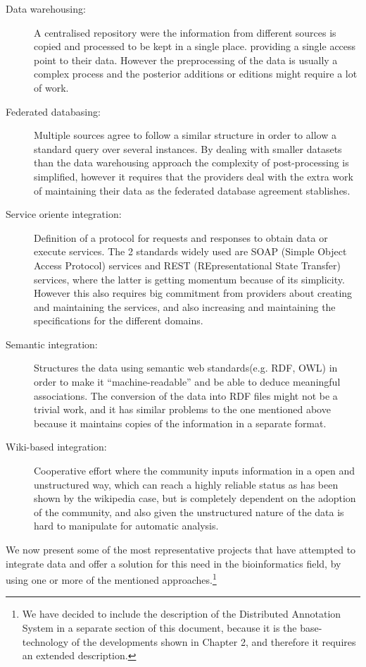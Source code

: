 \begin{description}
\item[Data warehousing:] 			A centralised repository were the information from different sources is copied and processed to be kept  in a single place. providing a single access point to their data. However the preprocessing of the data is usually a complex process and the posterior additions or editions might require a lot of work.
\item[Federated databasing:] 		Multiple sources agree to follow a similar structure in order to allow a standard query over several instances. By dealing with smaller datasets than the data warehousing approach the complexity of post-processing is simplified, however it requires that the providers deal with the extra work of maintaining their data as the federated database agreement stablishes.
\item[Service oriente integration:] 	Definition of a protocol for requests and responses to obtain data or execute services. The 2 standards widely used are SOAP (Simple Object Access Protocol) services and REST (REpresentational State Transfer) services, where the latter is getting momentum because of its simplicity. However this also requires big commitment from providers about creating and maintaining the services, and also increasing and maintaining the specifications for the different domains.
\item[Semantic integration:] 		Structures the data using semantic web standards(e.g. RDF, OWL) in order to make it ``machine-readable'' and be able to deduce meaningful associations. The conversion of the data into RDF files might not be a trivial work, and it has similar problems to the one mentioned above because it maintains copies of the information in a separate format. 
\item[Wiki-based integration:] 		Cooperative effort where the community inputs information in a open and unstructured way, which can reach a highly reliable status as has been shown by the wikipedia case, but is completely dependent on the adoption of the community, and also given the unstructured nature of the data is hard to manipulate for automatic analysis.
\end{description}

We now present some of the most representative projects that have attempted to integrate data and offer a solution for this need in the bioinformatics field, by using one or more of the mentioned approaches.\footnote{We have decided to include the description of the Distributed Annotation System in a separate section of this document, because it is the base-technology of the developments shown in Chapter 2, and therefore it requires an extended description.}


